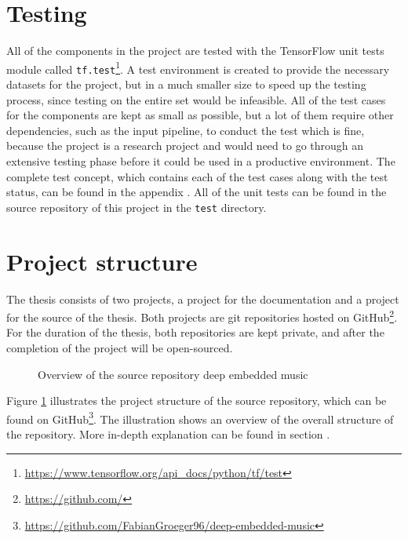 \section{Testing}
\label{sec:Testing}
All of the components in the project are tested with the TensorFlow unit tests module called \texttt{tf.test}\footnote{\url{https://www.tensorflow.org/api_docs/python/tf/test}}. A test environment is created to provide the necessary datasets for the project, but in a much smaller size to speed up the testing process, since testing on the entire set would be infeasible. All of the test cases for the components are kept as small as possible, but a lot of them require other dependencies, such as the input pipeline, to conduct the test which is fine, because the project is a research project and would need to go through an extensive testing phase before it could be used in a productive environment.
\newline
\newline
The complete test concept, which contains each of the test cases along with the test status, can be found in the appendix . All of the unit tests can be found in the source repository of this project in the \texttt{test} directory. 

\section{Project structure}
\label{sec:Project-Structure}
The thesis consists of two projects, a project for the documentation and a project for the source of the thesis. Both projects are git repositories hosted on GitHub\footnote{\url{https://github.com/}}. For the duration of the thesis, both repositories are kept private, and after the completion of the project will be open-sourced.

\begin{figure}[ht]
\caption{Overview of the source repository \flqq deep embedded music\frqq}
\label{fig:Project-Overview-Source}
\end{figure}
\noindent
Figure \ref{fig:Project-Overview-Source} illustrates the project structure of the source repository, which can be found on GitHub\footnote{\url{https://github.com/FabianGroeger96/deep-embedded-music}}. The illustration shows an overview of the overall structure of the repository. More in-depth explanation can be found in section .

